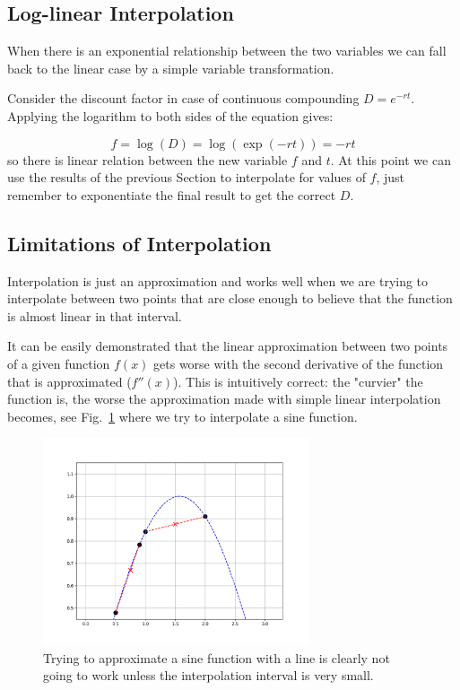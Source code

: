 \subsection{Log-linear Interpolation}
\label{log-linear-interpolation}
When there is an exponential relationship between the two variables we can fall back to the linear case by a simple variable transformation. 

Consider the discount factor in case of continuous compounding $D=e^{-rt}$. Applying the logarithm to both sides of the equation gives:

\begin{equation}
f = \log(D) = \log(\exp(-rt)) = -rt
\end{equation}
so there is linear relation between the new variable $f$ and $t$. At this point we can use the results of the previous Section to interpolate for values of $f$, just remember to exponentiate the final result to get the correct $D$.

\subsection{Limitations of Interpolation}
Interpolation is just an approximation and works well when we are trying to interpolate between two points that are close enough to believe that the function is almost linear in that interval.

It can be easily demonstrated that the linear approximation between two points of a given function $f(x)$ gets worse with the second derivative of the function that is approximated ($f''(x)$). This is intuitively correct: the "curvier" the function is, the worse the approximation made with simple linear interpolation becomes, see Fig.~\ref{fig:sine_interp} where we try to interpolate a sine function.

\begin{figure}
  \centering
  \includegraphics[width=0.7\textwidth]{figures/wrong_interp.png}
  \caption{Trying to approximate a sine function with a line is clearly not going to work unless the interpolation interval is very small.}
  \label{fig:sine_interp}
\end{figure}

